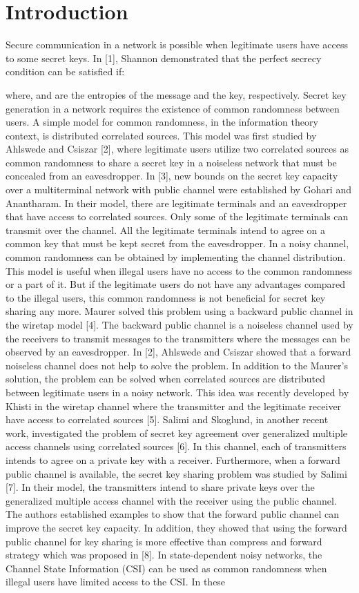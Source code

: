 \documentclass[conference,8pt]{IEEEtran}
\begin{document}
\section{Introduction}
Secure communication in a network is possible when legitimate users have access to some secret keys. In [1], Shannon demonstrated that the perfect secrecy condition can be satisfied if:

where,  and  are the entropies of the message and the key, respectively. Secret key generation in a network requires the existence of common randomness between users. A simple model for common randomness, in the information theory context, is distributed correlated sources. This model was first studied by Ahlswede and Csiszar  [2], where legitimate users utilize two correlated sources as common randomness to share a secret key in a noiseless network that must be concealed from an eavesdropper. In [3], new bounds on the secret key capacity over a multiterminal network with public channel were established by Gohari and Anantharam. In their model, there are  legitimate terminals and an eavesdropper that have access to correlated sources. Only some of the legitimate terminals can transmit over the channel. All the legitimate terminals intend to agree on a common key that must be kept secret from the eavesdropper. In a noisy channel, common randomness can be obtained by implementing the channel distribution. This model is useful when illegal users have no access to the common randomness or a part of it. But if the legitimate users do not have any advantages compared to the illegal users, this common randomness is not beneficial for secret key sharing any more. Maurer solved this problem using a backward public channel in the wiretap model [4]. The backward public channel is a noiseless channel used by the receivers to transmit messages to the transmitters where the messages can be observed by an eavesdropper. In [2], Ahlswede and Csiszar showed that a forward noiseless channel does not help to solve the problem. In addition to the Maurer's solution, the problem can be solved when correlated sources are distributed between legitimate users in a noisy network. This idea was recently developed by Khisti  in the wiretap channel where the transmitter and the legitimate receiver have access to correlated sources [5]. Salimi and Skoglund, in another recent work, investigated the problem of secret key agreement over generalized multiple access channels using correlated sources [6]. In this channel, each of transmitters intends to agree on a private key with a receiver. Furthermore, when a forward public channel is available, the secret key sharing problem was studied by Salimi  [7]. In their model, the transmitters intend to share private keys over the generalized multiple access channel with the receiver using the public channel. The authors established examples to show that the forward public channel can improve the secret key capacity. In addition, they showed that using the forward public channel for key sharing is more effective than compress and forward strategy which was proposed in [8]. In state-dependent noisy networks, the Channel State Information (CSI) can be used as common randomness when illegal users have limited access to the CSI. In these 
\end{document}
